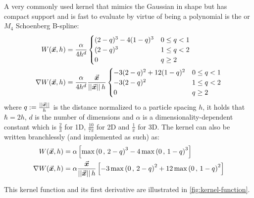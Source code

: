 A very commonly used kernel that mimics the Gaussian in shape but has compact support and
is fast to evaluate by virtue of being a polynomial is the  or $M_4$ Schoenberg B-spline\autocite*{price-2012}\autocite*{teschner-lecture}:
\begin{align}
  \label{eq:kernel-function}
  W(\vec{\bm{x}}, h)        & = \frac{\alpha}{4h^d}\begin{cases}
                                                (2-q)^3 -4(1-q)^3 & 0\leq q<1 \\
                                                (2-q)^3           & 1\leq q<2 \\
                                                0                 & q \geq 2
                                              \end{cases}                                   \\\label{eq:kernel-function-nabla}
  \nabla W(\vec{\bm{x}}, h) & = \frac{\alpha}{4h^d} \frac{\vec{\bm{x}}}{\left|\left|\vec{\bm{x}}\right|\right|h}\begin{cases}
                                                                                -3(2-q)^2+12(1-q)^2 & 0\leq q<1 \\
                                                                                -3(2-q)^2           & 1\leq q<2 \\
                                                                                0                   & q \geq 2
                                                                              \end{cases}
\end{align}
where $q:=\frac{\left|\left|\vec{\bm{x}}\right|\right|}{h}$ is the distance normalized to a particle spacing $h$, it holds that $\hbar=2h$, $d$ is the number of dimensions and $\alpha$ is a dimensionality-dependent constant which is $\frac{2}{3}$ for 1D, $\frac{10}{7 \pi}$ for 2D and $\frac{1}{\pi}$ for 3D\autocite*{price-2012}. The kernel can also be written branchlessly (and implemented as such) as\autocite*{teschner-lecture}:
\begin{align}
  W(\vec{\bm{x}}, h)        & = \alpha \left[\max\left(0\,,\, 2-q\right)^3 -4\max\left(0\,,\, 1-q\right)^3 \right]                                    \\
  \nabla W(\vec{\bm{x}}, h) & = \alpha \frac{\vec{\bm{x}}}{\left|\left|\vec{\bm{x}}\right|\right|h} \left[-3\max\left(0\,,\, 2-q\right)^2 +12\max\left(0\,,\, 1-q\right)^2 \right]
\end{align}

This kernel function and its first derivative are illustrated in \autoref{fig:kernel-function}.


